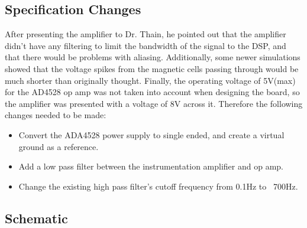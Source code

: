 \documentclass[10pt, journal]{IEEEtran}
\begin{document}
\subsection{Specification Changes}
After presenting the amplifier to Dr. Thain, he pointed out that the
amplifier didn't have any filtering to limit the bandwidth of the
signal to the DSP, and that there would be problems with
aliasing. Additionally, some newer simulations showed that the voltage
spikes from the magnetic cells passing through would be much shorter
than originally thought. Finally, the operating voltage of 5V(max) for the
AD4528 op amp was not taken into account when designing the board, so
the amplifier was presented with a voltage of 8V across it. Therefore
the following changes needed to be made:
\begin{itemize}
\item Convert the ADA4528 power supply to single ended, and create a
  virtual ground as a reference.
  
\item Add a low pass filter between the instrumentation amplifier and
  op amp.
  
\item Change the existing high pass filter's cutoff frequency from
  0.1Hz to ~700Hz.
\end{itemize}

\subsection{Schematic}
\end{document}

